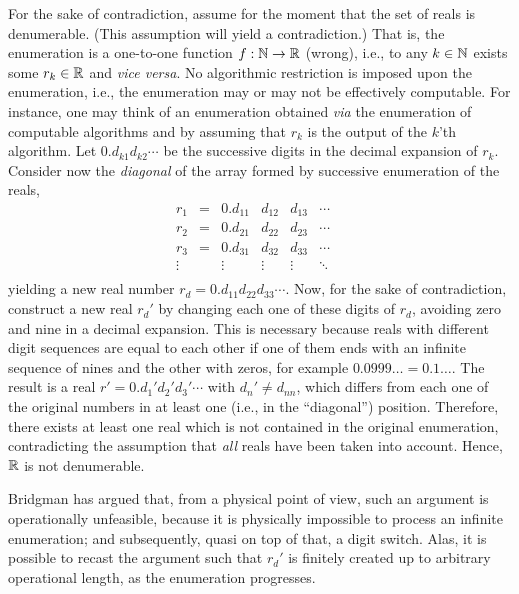 {\color{OliveGreen}
\bproof
 For the sake of contradiction, assume for the moment that the set of reals is denumerable.
 (This assumption will yield a contradiction.)
 That is, the enumeration is a one-to-one function $f: {\Bbb N} \rightarrow
 {\Bbb R}$ (wrong), i.e., to any $k\in {\Bbb N}$ exists some  $r_k\in {\Bbb R} $
 and {\it vice versa}. No algorithmic
 restriction is imposed upon the enumeration, i.e., the enumeration
 may or may not be effectively computable.
 For instance, one may think of an enumeration
 obtained {\it via} the
 enumeration of computable algorithms and by assuming that $r_k$ is the
 output of the $k$'th algorithm.
 Let $0.d_{k1}d_{k2}\cdots $ be the successive digits in the decimal
 expansion of $r_k$.
 Consider now the {\em diagonal} of the array formed by successive
 enumeration of the reals,
 \begin{equation}
 \begin{array}{ccccccccc}
 r_1&=&0.d_{11}&d_{12}&d_{13}&\cdots \\
 r_2&=&0.d_{21}& d_{22}&d_{23}&\cdots \\
 r_3&=&0.d_{31}&d_{32}& d_{33}&\cdots \\
 \vdots &&\vdots  &\vdots &\vdots & \ddots \\ \end{array} \quad
 \end{equation}
 yielding a new real number $r_d=0.d_{11}d_{22}d_{33}\cdots $.
 Now, for the sake of contradiction, construct a new real $r_d'$ by changing each one of these digits of $r_d$,
avoiding zero and nine in a decimal
 expansion. This is necessary because reals with different
 digit sequences are equal to each other if one of them ends with an
 infinite sequence of nines and the other with zeros, for example
 $0.0999\ldots =0.1\ldots $.
 The result is a real
  $r'=0.d_{1}'d_{2}'d_{3}'\cdots $
  with $d_n'\neq  d_{nn}$,
 which differs from each one of the original numbers in at least
 one (i.e., in the ``diagonal'') position.
 Therefore, there exists at least one real which is not contained in the
 original enumeration, contradicting the assumption that {\em all}
 reals have been taken into account.
 Hence, ${\Bbb R}$ is not denumerable.
\eproof
}

Bridgman has argued \cite{bridgman} that, from a physical point of view, such an argument is operationally unfeasible,
because it is physically impossible to process an infinite enumeration; and subsequently, quasi on top of that, a digit switch.
Alas, it is possible to recast the argument such that $r_d'$ is finitely created up to arbitrary operational length,
as the enumeration progresses.




\begin{center}
{\color{olive}   \Huge
\decofourright
}
\end{center}
